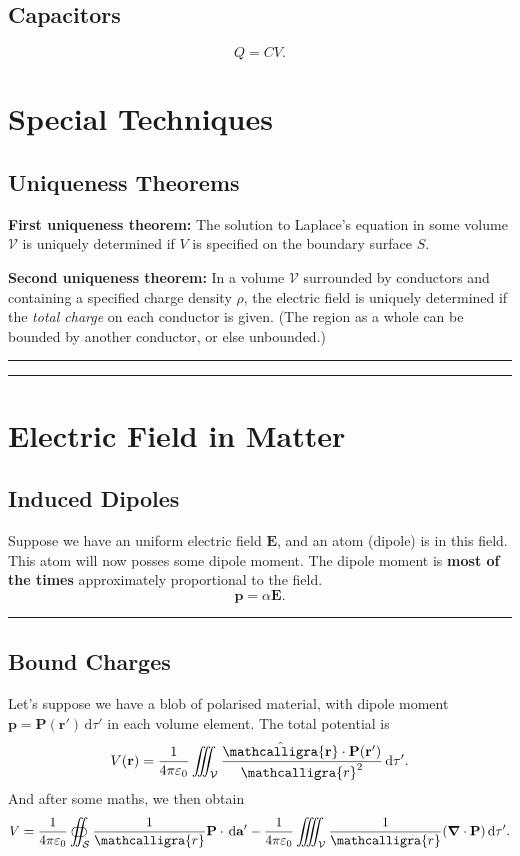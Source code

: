 \documentclass[a4paper]{article}
\newcommand{\dmr}[1]{\, \mathrm{d}#1} %
\numberwithin{equation}{subsection}
\newcommand{\curly}[1]{\ensuremath{\mathcalligra{#1}}}
\let\oldhat\hat
\renewcommand{\vec}[1]{\mathbf{#1}}
\renewcommand{\hat}[1]{\oldhat{\mathbf{#1}}}
\begin{document}
\subsection{Capacitors}

\begin{equation*}
    Q = CV.
\end{equation*}

\medskip
\section{Special Techniques}
\subsection{Uniqueness Theorems}
\textbf{First uniqueness theorem:} The solution to Laplace's equation in some volume $\mathcal{V}$ is uniquely determined if $V$ is specified on the boundary surface $S$.

\textbf{Second uniqueness theorem:} In a volume $\mathcal{V}$ surrounded by conductors and containing a specified charge density $\rho$, the electric field is uniquely determined if the \textit{total charge} on each conductor is given. (The region as a whole can be bounded by another conductor, or else unbounded.)\cite{Griffiths:611579}

\par\noindent\rule{\textwidth}{0.4pt}
\par\noindent\rule{\textwidth}{0.4pt}
\section{Electric Field in Matter}
\subsection{Induced Dipoles}
Suppose we have an uniform electric field $\vec{E}$, and an atom (dipole) is in this field. This atom will now posses some dipole moment. The dipole moment is \textbf{most of the times} approximately proportional to the field.
\begin{equation}
    \vec{p} = \alpha \vec{E}.
\end{equation}
\par\noindent\rule{\textwidth}{0.4pt}
\subsection{Bound Charges}
Let's suppose we have a blob of polarised material, with dipole moment $\vec{p} = \vec{P}(\vec{r'})\dmr{\tau'}$ in each volume element. The total potential is 
\[
    V(\vec{r})= \frac{1}{4 \pi \varepsilon_0}\iiint_{\mathcal{V}}\frac{\hat{\curly{r}}\cdot \vec{P}(\vec{r'})}{\curly{r}^2}\dmr{\tau'}.
\]
And after some maths, we then obtain
\begin{equation}
    V = \frac{1}{4 \pi \varepsilon_0} \oiint_{\mathcal{S}} \frac{1}{\curly{r}} \vec{P}\cdot \dmr{\vec{a'}} - \frac{1}{4 \pi \varepsilon_0} \iiiint_{\mathcal{V}} \frac{1}{\curly{r}} (\grad \cdot \vec{P}) \dmr{\tau'}.    
\end{equation}
\end{document}
